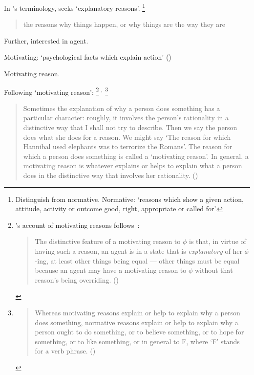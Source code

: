 \begin{note}
  In \citeauthor{Hieronymi:2011aa}'s terminology, \qWhy{} seeks `explanatory reasons'.
  \footnote{
    Distinguish from normative.
    Normative: `reasons which show a given action, attitude, activity or outcome good, right, appropriate or called for'.
  }

  \begin{quote}
    the reasons why things happen, or why things are the way they are

    \citeyear[410]{Hieronymi:2011aa}
  \end{quote}

  Further, interested in agent.

  Motivating: `psychological facts which explain action'
  (\citeyear[411--412]{Hieronymi:2011aa})

  Motivating reason.

  Following \citeauthor{Broome:2013aa} `motivating reason':%
  \footnote{
     \citeauthor{Hieronymi:2011aa}'s account of motivating reasons follows~\citeauthor{Smith:1994wo}:

    \begin{quote}
      The distinctive feature of a motivating reason to \(\phi\) is that, in virtue of having such a reason, an agent is in a state that is \emph{explanatory} of her \(\phi\)-ing, at least other things being equal --- other things must be equal because an agent may have a motivating reason to \(\phi\) without that reason's being overriding.%
      \mbox{}\hfill\mbox{(\citeyear{Smith:1994wo})}
    \end{quote}
  }%
  \(^{,}\)%
  \footnote{
    \begin{quote}
      Whereas motivating reasons explain or help to explain why a person does something, normative reasons explain or help to explain why a person ought to do something, or to believe something, or to hope for something, or to like something, or in general to F, where ‘F' stands for a verb phrase.%
    \mbox{}\hfill\mbox{(\citeyear[47]{Broome:2013aa})}
    \end{quote}
  }
  \begin{quote}
    Sometimes the explanation of why a person does something has a particular character:
    roughly, it involves the person's rationality in a distinctive way that I shall not try to describe.
    Then we say the person does what she does for a reason.
    We might say ‘The reason for which Hannibal used elephants was to terrorize the Romans'.
    The reason for which a person does something is called a ‘motivating reason'.
    In general, a motivating reason is whatever explains or helps to explain what a person does in the distinctive way that involves her rationality.
    \mbox{}\hfill\mbox{(\citeyear[46--47]{Broome:2013aa})}
  \end{quote}
\end{note}

